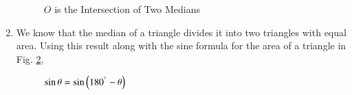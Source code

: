 \begin{enumerate}[label=\arabic*.,ref=\thesubsection.\theenumi]
\begin{figure}[!ht]
	\begin{center}
		
		\resizebox{\columnwidth}{!}{}
	\end{center}
	\caption{$O$ is the Intersection of Two Medians}
	\label{ch2_median_ratio}	
\end{figure}
%
%
%
%
\item
	We know that the median of a triangle  divides it into two triangles with equal area. Using this result along with the sine formula for the area of a triangle in Fig. \ref{ch2_supp_sin},
\begin{figure}[!ht]
	\begin{center}
		
		\resizebox{\columnwidth}{!}{}
	\end{center}
	\caption{$\sin \theta = \sin \left(180^{\degree}-\theta\right)$}
	\label{ch2_supp_sin}	
\end{figure}


\end{enumerate}
